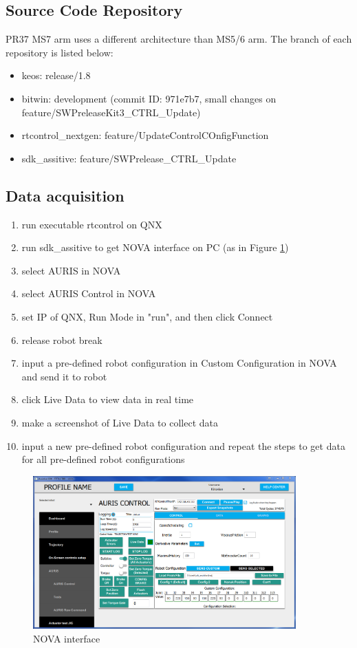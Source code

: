 \subsection{Source Code Repository}
PR37 MS7 arm uses a different architecture than MS5/6 arm. The branch of each repository is listed below:
\begin{itemize}
	\item keos: release/1.8
	\item bitwin: development (commit ID: 971e7b7, small changes on feature/SWPreleaseKit3\_CTRL\_Update)
	\item rtcontrol\_nextgen: feature/UpdateControlCOnfigFunction
	\item sdk\_assitive: feature/SWPrelease\_CTRL\_Update
\end{itemize}

\subsection{Data acquisition}
\begin{enumerate}
	\item run executable rtcontrol on QNX
	\item run sdk\_assitive to get NOVA interface on PC (as in Figure \ref{fig:nova})
	\item select AURIS in NOVA
	\item select AURIS Control in NOVA
	\item set IP of QNX, Run Mode in "run", and then click Connect
	\item release robot break
	\item input a pre-defined robot configuration in Custom Configuration in NOVA and send it to robot
	\item click Live Data to view data in real time
	\item make a screenshot of Live Data to collect data
	\item input a new pre-defined robot configuration and repeat the steps to get data for all pre-defined robot configurations
\end{enumerate}

\begin{figure}
	\begin{center}
		\includegraphics[width=0.9\textwidth]{./images/NOVA}%
		\caption{NOVA interface}
		\label{fig:nova}%
	\end{center}
\end{figure}
